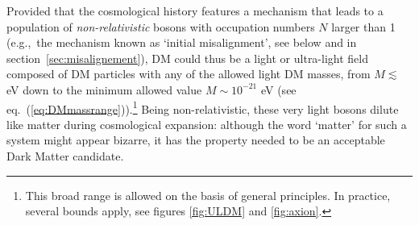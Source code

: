 \medskip

Provided that the cosmological history features a mechanism that leads to a population of {\em non-relativistic} bosons with occupation numbers $N$ larger than 1 (e.g.,~the mechanism known as `initial misalignment', see below and in section~\ref{sec:misalignement}), DM could thus be a light or ultra-light field composed of DM particles with any of the allowed light DM masses, from $M \lesssim $ eV down to the minimum allowed value 
$M \sim 10^{-21}$ eV (see eq.~(\ref{eq:DMmassrange})).\footnote{This broad range is allowed on the basis of general principles. In practice, several bounds apply, see figures \ref{fig:ULDM} and \ref{fig:axion}.}
Being non-relativistic, these very light bosons dilute like matter during cosmological expansion:
although the word `matter'  for such a system might appear bizarre,
it has the property needed to be an acceptable Dark Matter candidate.

\medskip

